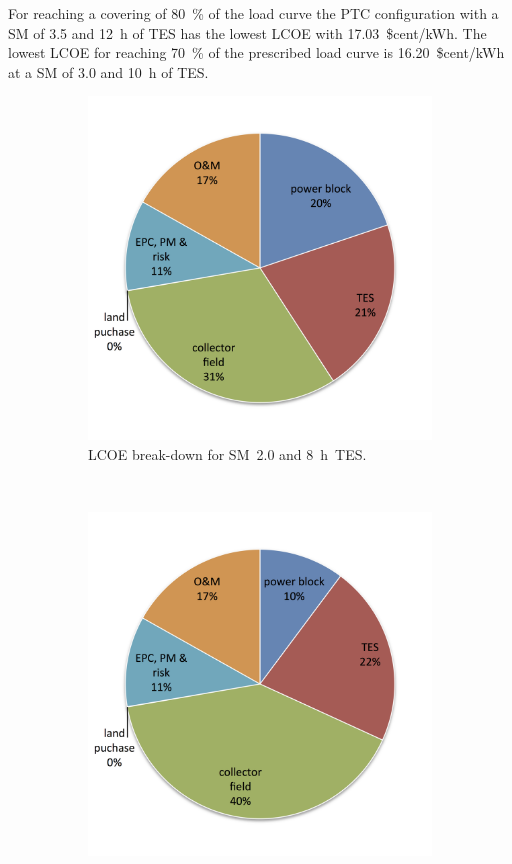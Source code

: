 For reaching a covering of 80~\% of the load curve the PTC configuration with a SM of 3.5 and 12~h of TES has the lowest LCOE with 17.03~\$cent/kWh. The lowest LCOE for reaching 70~\% of the prescribed load curve is 16.20~\$cent/kWh at a SM of 3.0 and 10~h of TES.
\begin{figure}[!htbp]
        \centering                
        \begin{subfigure}[b]{0.5\textwidth}
                \centering
                \includegraphics[width=1\textwidth]{FIG/PTC_LCOE_lowinvest_BreakDown}
                \caption{LCOE break-down for SM~2.0 and 8~h~TES.}\label{PTC_LCOE_lowinvest_BreakDown}
        \end{subfigure}%
        ~
        \begin{subfigure}[b]{0.5\textwidth}
                \centering
                \includegraphics[width=1\textwidth]{FIG/PTC_LCOE_highinvest_BreakDown}

\end{subfigure}
\end{figure}
